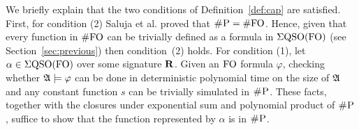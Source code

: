 We briefly explain that the two conditions of Definition~\ref{def:cap} are satisfied. First, for condition (2) Saluja et al. proved that $\text{\sc \#P} = \#{\rm FO}$\cite{SalujaST95}. Hence, given that every function in $\#{\rm FO}$ can be trivially defined as a formula in $\Sigma{\rm QSO}({\rm FO})$ (see Section~\ref{sec:previous}) then condition~(2) holds.
For condition (1), let $\alpha\in\Sigma{\rm QSO}({\rm FO})$ over some signature $\mathbf{R}$. Given an ${\rm FO}$ formula $\varphi$, checking whether $\mathfrak{A}\models\varphi$ can be done in deterministic polynomial time on the size of $\mathfrak{A}$ and any constant function $s$ can be trivially simulated in $\text{\sc \#P}$. These facts, together with the closures under exponential sum and polynomial product of $\text{\sc \#P}$\cite{F97}, suffice to show that the function represented by $\alpha$ is in $\text{\sc \#P}$.
